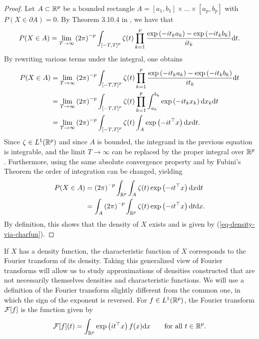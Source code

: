 \begin{proof}
    Let $A \subset \Rp$ be a bounded rectangle $A = [a_1, b_1] \times \ldots \times [a_p, b_p]$ with $P(X \in \partial A) = 0$. By Theorem 3.10.4 in \cite{durrett_2019}, we have that
    \begin{equation*}
        P(X \in A) = \lim_{T \rightarrow \infty} \left(2\pi\right)^{-p}\int_{\left[-T, T\right]^p} \zeta(t) \prod_{k=1}^p \frac{\expf{-it_k a_k} - \expf{-it_k b_k}}{i t_k} \d t.
    \end{equation*}
    By rewriting various terms under the integral, one obtains
    \begin{align*}
        P(X \in A) 
        &= \lim_{T \rightarrow \infty} \left(2\pi\right)^{-p}\int_{\left[-T, T\right]^p} \zeta(t) \prod_{k=1}^p \frac{\expf{-it_k a_k} - \expf{-it_k b_k}}{i t_k} \d t \\
        &= \lim_{T \rightarrow \infty} \left(2\pi\right)^{-p}\int_{\left[-T, T\right]^p} \zeta(t) \prod_{k=1}^p \int_{a_k}^{b_k}\expf{-i t_k x_k} \d x_k \d t \\
        &= \lim_{T \rightarrow \infty} \left(2\pi\right)^{-p}\int_{\left[-T, T\right]^p} \zeta(t) \int_A \expf{-i t^\top x} \d x \d t.
    \end{align*}
    Since $\zeta \in L^1(\Rp)$ and since $A$ is bounded, the integrand in the previous equation is integrable, and the limit $T \rightarrow \infty$ can be replaced by the proper integral over $\Rp$. Furthermore, using the same absolute convergence property and by Fubini's Theorem the order of integration can be changed, yielding
    \begin{align*}
        P(X \in A) 
        &= \left(2\pi\right)^{-p}\intRp{t}{\int_A \zeta(t) \expf{-i t^\top x} \d x} \\
        &= \int_A \left(2\pi\right)^{-p} \intRp{t}{\zeta(t) \expf{-i t^\top x} } \d x.
    \end{align*}
    By definition, this shows that the density of $X$ exists and is given by (\ref{eq-density-via-charfun}).
\end{proof}

If $X$ has a density function, the characteristic function of $X$ corresponds to the Fourier transform of its density. Taking this generalized view of Fourier transforms will allow us to study approximations of densities constructed that are not necessarily themselves densities and characteristic functions. We will use a definition of the Fourier transform slightly different from the common one, in which the sign of the exponent is reversed. For $f \in L^1(\Rp)$, the Fourier transform $\F[f]$ is the function given by
\begin{equation} \label{eq-fourier-density}
    \F[f](t) = \int_\Rp \expf{it^\top x}f(x)\d x \ \ \ \ \ \ \t{for all } t \in \Rp.
\end{equation}

